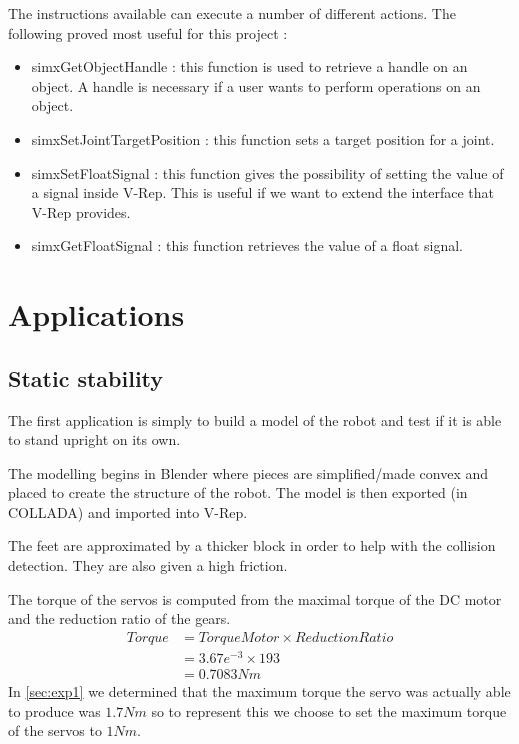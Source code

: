 The instructions available can execute a number of different actions. The following proved most useful for this project :\begin{itemize}
\item simxGetObjectHandle : this function is used to retrieve a handle on an object. A handle is necessary if a user wants to perform operations on an object.
\item simxSetJointTargetPosition : this function sets a target position for a joint.
\item simxSetFloatSignal : this function gives the possibility of setting the value of a signal inside V-Rep. This is useful if we want to extend the interface that V-Rep provides.
\item simxGetFloatSignal : this function retrieves the value of a float signal. 
\end{itemize}




\section{Applications}
\subsection{Static stability}
The first application is simply to build a model of the robot and test if it is able to stand upright on its own.

The modelling begins in Blender where pieces are simplified/made convex and placed to create the structure of the robot. The model is then exported (in COLLADA) and imported into V-Rep. 

The feet are approximated by a thicker block in order to help with the collision detection. They are also given a high friction.

The torque of the servos is computed from the maximal torque of the DC motor and the reduction ratio of the gears. 
\begin{align*}
Torque &= TorqueMotor \times ReductionRatio\\
&= 3.67e^{-3} \times 193\\
&= 0.7083Nm
\end{align*}
In \cref{sec:exp1} we determined that the maximum torque the servo was actually able to produce was $1.7Nm$ so to represent this we choose to set the maximum torque of the servos to $1Nm$.

